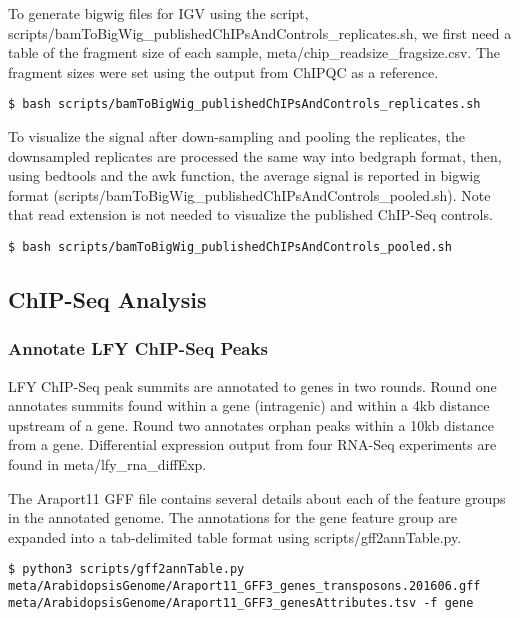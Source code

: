 \documentclass{article}
\begin{document}
\begin{sloppypar}
To generate bigwig files for IGV using the script, {\selectfont scripts/bamToBigWig\_publishedChIPsAndControls\_replicates.sh}, we first need a table of the fragment size of each sample, {\selectfont meta/chip\_readsize\_fragsize.csv}. The fragment sizes were set using the output from ChIPQC as a reference.

\begin{verbatim}
$ bash scripts/bamToBigWig_publishedChIPsAndControls_replicates.sh
\end{verbatim}

To visualize the signal after down-sampling and pooling the replicates, the downsampled replicates are processed the same way into bedgraph format, then, using bedtools and the awk function, the average signal is reported in bigwig format ({\selectfont scripts/bamToBigWig\_publishedChIPsAndControls\_pooled.sh}). Note that read extension is not needed to visualize the published ChIP-Seq controls. 

\begin{verbatim}
$ bash scripts/bamToBigWig_publishedChIPsAndControls_pooled.sh
\end{verbatim}

\subsection{ChIP-Seq Analysis}
\subsubsection{Annotate LFY ChIP-Seq Peaks}
LFY ChIP-Seq peak summits are annotated to genes in two rounds. Round one annotates summits found within a gene (intragenic) and within a 4kb distance upstream of a gene. Round two annotates orphan peaks within a 10kb distance from a gene.  Differential expression output from four RNA-Seq experiments are found in {\selectfont meta/lfy\_rna\_diffExp}.

The Araport11 GFF file contains several details about each of the feature groups in the annotated genome. The annotations for the gene feature group are expanded into a tab-delimited table format using {\selectfont scripts/gff2annTable.py}.

\begin{verbatim}
$ python3 scripts/gff2annTable.py meta/ArabidopsisGenome/Araport11_GFF3_genes_transposons.201606.gff meta/ArabidopsisGenome/Araport11_GFF3_genesAttributes.tsv -f gene
\end{verbatim}


\end{sloppypar}
\end{document}

